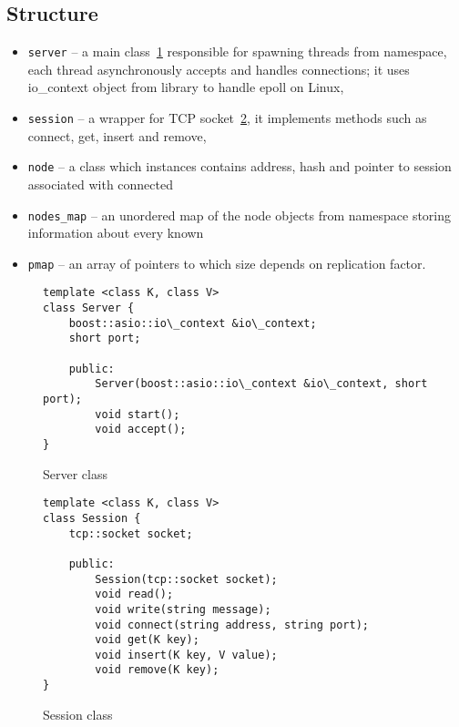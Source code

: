     \subsection{Structure}  %
        \begin{itemize}
        \item \texttt{server} -- a main class~\ref{Server} responsible for spawning threads from \std namespace, each thread asynchronously accepts and handles connections;
        it uses io\_context object from \Asio library to handle epoll on Linux,
        \item \texttt{session} -- a wrapper for TCP socket~\ref{Session}, it implements methods such as connect, get, insert and remove,
        \item \texttt{node} -- a class which instances contains address, hash and pointer to session associated with connected \Node
        \item \texttt{nodes\_map} -- an unordered map of the node objects from \std namespace storing information about every known \Node
        \item \texttt{pmap} -- an array of pointers to \PHT which size depends on replication factor.
        \end{itemize}

\begin{figure}[ht] 
\renewcommand{\figurename}{Listing}
    \begin{lstlisting}
template <class K, class V>
class Server {
    boost::asio::io\_context &io\_context;
    short port;
    
    public:
        Server(boost::asio::io\_context &io\_context, short port);
        void start();
        void accept();
}
    \end{lstlisting}
\label{Server}
\caption{Server class}
\end{figure}
       
\begin{figure}[ht] 
\renewcommand{\figurename}{Listing}
    \begin{lstlisting}
template <class K, class V>
class Session {
    tcp::socket socket;
    
    public:
        Session(tcp::socket socket);
        void read();
        void write(string message);
        void connect(string address, string port);
        void get(K key);
        void insert(K key, V value);
        void remove(K key);
}
    \end{lstlisting}
\label{Session}
\caption{Session class}
\end{figure}
        
